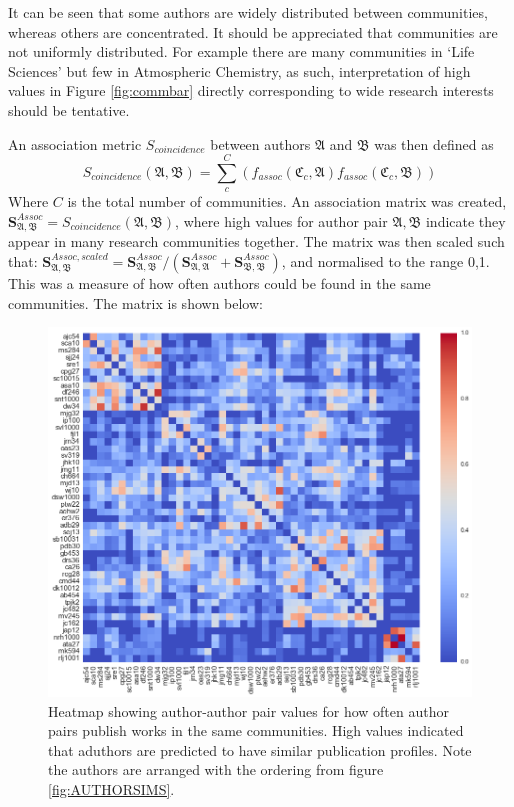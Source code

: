 It can be seen that some authors are widely distributed between communities, whereas others are concentrated.
It should be appreciated that communities are not uniformly distributed. For example there are many communities in `Life Sciences' but few in Atmospheric Chemistry, as such, interpretation of high values in Figure \ref{fig:commbar} directly corresponding to wide research interests should be tentative.

An association metric $S_{coincidence}$ between authors $\mathfrak{A}$ and $\mathfrak{B}$ was then defined as $$S_{coincidence}\left( \mathfrak{A} , \mathfrak{B} \right) = \sum_c^C \left(f_{assoc} \left( \mathfrak{C}_c , \mathfrak{A} \right) f_{assoc}\left( \mathfrak{C}_c , \mathfrak{B} \right) \right) $$
Where $C$ is the total number of communities. An association matrix was created, $\mathbf{S}^{Assoc}_{\mathfrak{A} , \mathfrak{B}} = S_{coincidence}\left( \mathfrak{A} , \mathfrak{B} \right)$, where high values for author pair $\mathfrak{A} , \mathfrak{B}$ indicate they appear in many research communities together. The matrix was then scaled such that: $\mathbf{S}^{Assoc,scaled}_{\mathfrak{A} , \mathfrak{B}} =  \mathbf{S}^{Assoc}_{\mathfrak{A} , \mathfrak{B}} /  \left( \mathbf{S}^{Assoc}_{\mathfrak{A} , \mathfrak{A}} + \mathbf{S}^{Assoc}_{\mathfrak{B} , \mathfrak{B}} \right) $, and normalised to the range 0,1. This was a measure of how often authors could be found in the same communities. The matrix is shown below:
\begin{center}
\begin{figure}[H]
  \centering
    \includegraphics[width=\textwidth]{Analysis/author_comm_heatmap.png}
    \caption{Heatmap showing author-author pair values for how often author pairs publish works in the same communities. High values indicated that aduthors are predicted to have similar publication profiles. Note the authors are arranged with the ordering from figure \ref{fig:AUTHORSIMS}.}
    \label{fig:commHEATMAP}

\end{figure} 
\end{center}
